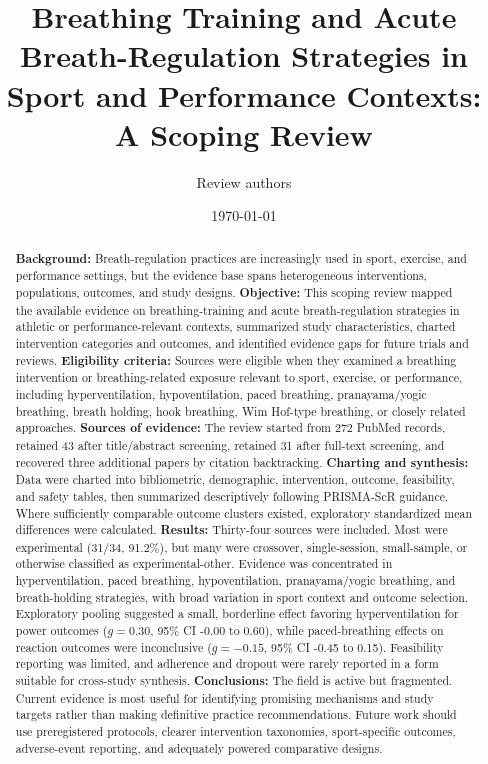 \documentclass[11pt,a4paper]{article}
\title{\textbf{Breathing Training and Acute Breath-Regulation Strategies in Sport and Performance Contexts: A Scoping Review}}
\author{Review authors}
\date{\today}
\begin{document}
\maketitle

\begin{abstract}
\textbf{Background:} Breath-regulation practices are increasingly used in sport, exercise, and performance settings, but the evidence base spans heterogeneous interventions, populations, outcomes, and study designs. \textbf{Objective:} This scoping review mapped the available evidence on breathing-training and acute breath-regulation strategies in athletic or performance-relevant contexts, summarized study characteristics, charted intervention categories and outcomes, and identified evidence gaps for future trials and reviews. \textbf{Eligibility criteria:} Sources were eligible when they examined a breathing intervention or breathing-related exposure relevant to sport, exercise, or performance, including hyperventilation, hypoventilation, paced breathing, pranayama/yogic breathing, breath holding, hook breathing, Wim Hof-type breathing, or closely related approaches. \textbf{Sources of evidence:} The review started from 272 PubMed records, retained 43 after title/abstract screening, retained 31 after full-text screening, and recovered three additional papers by citation backtracking. \textbf{Charting and synthesis:} Data were charted into bibliometric, demographic, intervention, outcome, feasibility, and safety tables, then summarized descriptively following PRISMA-ScR guidance. Where sufficiently comparable outcome clusters existed, exploratory standardized mean differences were calculated. \textbf{Results:} Thirty-four sources were included. Most were experimental (31/34, 91.2\%), but many were crossover, single-session, small-sample, or otherwise classified as experimental-other. Evidence was concentrated in hyperventilation, paced breathing, hypoventilation, pranayama/yogic breathing, and breath-holding strategies, with broad variation in sport context and outcome selection. Exploratory pooling suggested a small, borderline effect favoring hyperventilation for power outcomes ($g=0.30$, 95\% CI -0.00 to 0.60), while paced-breathing effects on reaction outcomes were inconclusive ($g=-0.15$, 95\% CI -0.45 to 0.15). Feasibility reporting was limited, and adherence and dropout were rarely reported in a form suitable for cross-study synthesis. \textbf{Conclusions:} The field is active but fragmented. Current evidence is most useful for identifying promising mechanisms and study targets rather than making definitive practice recommendations. Future work should use preregistered protocols, clearer intervention taxonomies, sport-specific outcomes, adverse-event reporting, and adequately powered comparative designs.
\end{abstract}
\end{document}
